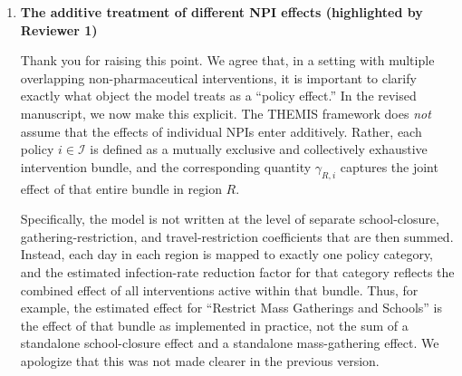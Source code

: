 \documentclass[letterpaper,twoside,11pt]{reviewresponse}
\begin{document}
\begin{enumerate}
In all four regions, the cost-minimizing policy at baseline is a moderate, time-limited intervention sequence (``Restrict Mass Gatherings and Schools and Others'' in the early months, tapering to a less restrictive policy). Where the identity of the optimal policy changes at small $f$ values (e.g., $f = 0.10$ for Germany and New York), it shifts to a closely related moderate sequence that differs only in the third month. The qualitative conclusion, that moderate, tapered interventions dominate both prolonged lockdown and no action, is preserved through $f = 0.90$ in every region.

Overall, these results demonstrate that the policy rankings produced by THEMIS are not being driven by particularly sensitive estimates of the differential NPI effects. One can eliminate 50\% or more of the estimated policy contrast without materially changing the ranking in any of the four focal regions.

We agree, of course, that no sensitivity analysis can fully eliminate the possibility of unmeasured confounding in an observational setting. At the same time, we believe this new analysis substantially strengthens the manuscript by showing that the policy rankings produced by THEMIS are stable to large attenuations in the estimated differential NPI effects. For this reason, while the revised manuscript does not eliminate the usual identification concerns of an observational study, it does show that the paper's substantive policy conclusions are robust to substantial weakening of the estimated differential NPI effects.

\item \textbf{The additive treatment of different NPI effects (highlighted by Reviewer 1)}

Thank you for raising this point. We agree that, in a setting with multiple overlapping non-pharmaceutical interventions, it is important to clarify exactly what object the model treats as a ``policy effect.'' In the revised manuscript, we now make this explicit. The THEMIS framework does \emph{not} assume that the effects of individual NPIs enter additively. Rather, each policy $i \in \mathcal{I}$ is defined as a mutually exclusive and collectively exhaustive intervention bundle, and the corresponding quantity $\gamma_{R,i}$ captures the joint effect of that entire bundle in region $R$.

Specifically, the model is not written at the level of separate school-closure, gathering-restriction, and travel-restriction coefficients that are then summed. Instead, each day in each region is mapped to exactly one policy category, and the estimated infection-rate reduction factor for that category reflects the combined effect of all interventions active within that bundle. Thus, for example, the estimated effect for ``Restrict Mass Gatherings and Schools'' is the effect of that bundle as implemented in practice, not the sum of a standalone school-closure effect and a standalone mass-gathering effect. We apologize that this was not made clearer in the previous version.


\end{enumerate}
\end{document}
